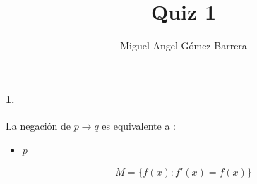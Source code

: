 \documentclass{article}
\title{Quiz 1}
\author{Miguel Angel Gómez Barrera}
\begin{document}
\maketitle
\paragraph{1.} La negación de $p \rightarrow q$ es equivalente a :
\begin{itemize}
	\item $p $
\end{itemize}
\begin{align*}
	M = \{ f(x) : f'(x) = f(x) \}
\end{align*}
\end{document}
